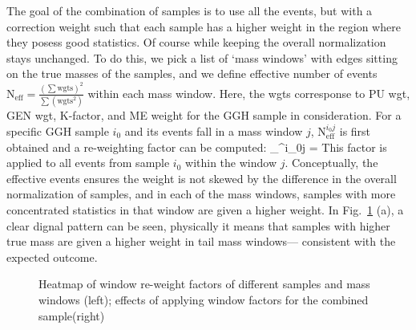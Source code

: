 The goal of the combination of samples is to use all the events, but with a correction weight
such that each sample has a higher weight in the region where they posess good statistics. Of
course while keeping the overall normalization stays unchanged. To do this, we pick a list of
`mass windows' with edges sitting on the true masses of the samples, and we define effective
number of events $\mathrm{N}_\mathrm{eff} = \frac{(\sum\mathrm{wgts})^2}{\sum(\mathrm{wgts}^2)}$
within each mass window. Here, the wgts corresponse to PU wgt, GEN wgt, K-factor, and ME weight for
the GGH sample in consideration. For a specific GGH sample $i_0$ and its events fall in a mass 
window $j$, $\mathrm{N}_\mathrm{eff}^{i_0j}$ is first obtained and a re-weighting factor can be computed:
\be
{}_^{i_0j} = 
\ee
This factor is applied to all events from sample $i_0$ within the window $j$. Conceptually,
the effective events ensures the weight is not skewed by the difference in the overall
normalization of samples, and in each of the mass windows, samples with more concentrated
statistics in that window are given a higher weight. In Fig.~\ref{fig:window_wgt_matrix} (a), a
clear dignal pattern can be seen, physically it means that samples with higher true 
mass are given a higher weight in tail mass windows--- consistent with the expected outcome.
\begin{figure}[htb]
    \begin{center}
    \end{center}
    \caption{Heatmap of window re-weight factors of different samples and mass windows (left);
    effects of applying window factors for the combined sample(right)}
    \label{fig:window_wgt_matrix}
\end{figure}

